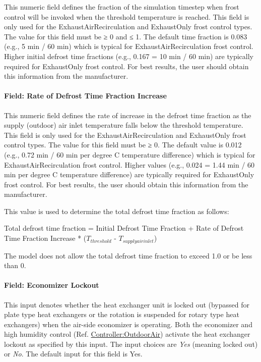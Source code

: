 This numeric field defines the fraction of the simulation timestep when frost control will be invoked when the threshold temperature is reached. This field is only used for the ExhaustAirRecirculation and ExhaustOnly frost control types. The value for this field must be ≥ 0 and ≤ 1. The default time fraction is 0.083 (e.g., 5 min / 60 min) which is typical for ExhaustAirRecirculation frost control. Higher initial defrost time fractions (e.g., 0.167 = 10 min / 60 min) are typically required for ExhaustOnly frost control. For best results, the user should obtain this information from the manufacturer.

\paragraph{Field: Rate of Defrost Time Fraction Increase}\label{field-rate-of-defrost-time-fraction-increase}

This numeric field defines the rate of increase in the defrost time fraction as the supply (outdoor) air inlet temperature falls below the threshold temperature. This field is only used for the ExhaustAirRecirculation and ExhaustOnly frost control types. The value for this field must be ≥ 0. The default value is 0.012 (e.g., 0.72 min / 60 min per degree C temperature difference) which is typical for ExhaustAirRecirculation frost control. Higher values (e.g., 0.024 = 1.44 min / 60 min per degree C temperature difference) are typically required for ExhaustOnly frost control. For best results, the user should obtain this information from the manufacturer.

This value is used to determine the total defrost time fraction as follows:


Total defrost time fraction = Initial Defrost Time Fraction +
Rate of Defrost Time Fraction Increase * (\(T_{threshold}\) - \(T_{supply air inlet}\))

The model does not allow the total defrost time fraction to exceed 1.0 or be less than 0.

\paragraph{Field: Economizer Lockout}\label{field-economizer-lockout-1}

This input denotes whether the heat exchanger unit is locked out (bypassed for plate type heat exchangers or the rotation is suspended for rotary type heat exchangers) when the air-side economizer is operating. Both the economizer and high humidity control (Ref. \hyperref[controlleroutdoorair]{Controller:OutdoorAir}) activate the heat exchanger lockout as specified by this input. The input choices are \emph{Yes} (meaning locked out) or \emph{No}. The default input for this field is Yes.

